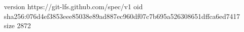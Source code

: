 version https://git-lfs.github.com/spec/v1
oid sha256:076d4ef3853eee85038e89ad887ec960df07c7b695a526308651dffca6ed7417
size 2872
